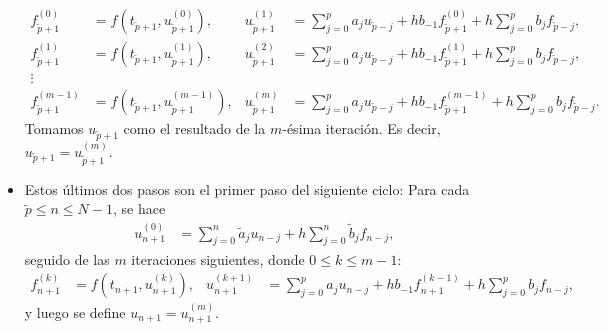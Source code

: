 \documentclass[11pt,letterpaper]{report}
\begin{document}
\begin{itemize}
    \begin{align}
      f_{\tilde p + 1}^{(0)}
      &= f(t_{\tilde p+1},u_{\tilde p + 1}^{(0)}),
      &
        u_{\tilde p + 1}^{(1)}
        &= \sum_{j=0}^{p}a_ju_{\tilde p-j}
        + h b_{-1}f_{\tilde p+1}^{(0)}
        + h \sum_{j=0}^{p}b_jf_{\tilde p-j},
        \\
      f_{\tilde p + 1}^{(1)}
      &= f(t_{\tilde p+1},u_{\tilde p + 1}^{(1)}),
      &
        u_{\tilde p + 1}^{(2)}
        &= \sum_{j=0}^{p}a_ju_{\tilde p-j}
        + h b_{-1}f_{\tilde p+1}^{(1)}
        + h \sum_{j=0}^{p}b_jf_{\tilde p-j},
        \\
      \vdots \nonumber
      \\
      f_{\tilde p + 1}^{(m-1)}
      &= f(t_{\tilde p+1},u_{\tilde p + 1}^{(m-1)}),
      &
        u_{\tilde p + 1}^{(m)}
        &= \sum_{j=0}^{p}a_ju_{\tilde p-j}
        + h b_{-1}f_{\tilde p+1}^{(m-1)}
        + h \sum_{j=0}^{p}b_jf_{\tilde p-j}.
    \end{align}
    Tomamos $u_{\tilde p+1}$ como el resultado de la $m$-ésima
    iteración. Es decir, $u_{\tilde p+1} = u_{\tilde p + 1}^{(m)}$.
  \item
    Estos últimos dos pasos son el primer paso del siguiente ciclo:
    Para cada $\tilde p\leq n\leq N-1$, se hace
    \begin{align}
      u_{n+1}^{(0)}
      &=
      \sum_{j=0}^{n}\tilde a_j u_{n-j}
      + h \sum_{j=0}^{n}\tilde b_j f_{n-j}
    ,\end{align}
    seguido de las $m$ iteraciones siguientes, donde $0\leq k\leq
    m-1$:
    \begin{align}
      f_{n + 1}^{(k)}
      &= f(t_{n+1},u_{n + 1}^{(k)}),
      &
        u_{n + 1}^{(k+1)}
        &= \sum_{j=0}^{p}a_ju_{n-j}
        + h b_{-1}f_{n+1}^{(k-1)}
        + h \sum_{j=0}^{p}b_jf_{n-j},
    \end{align}
    y luego se define $u_{n+1}=u_{n+1}^{(m)}$.
\end{itemize}
  
\end{document}
